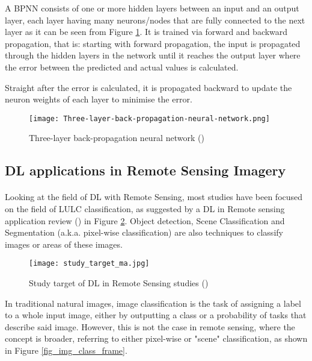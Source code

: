 A \gls{BPNN} consists of one or more hidden layers between an input and an output layer, each layer having many neurons/nodes that are fully connected to the next layer as it can be seen from Figure \ref{fig_bpnn}.  It is trained via forward and backward propagation, that is: starting with forward propagation, the input is propagated through the hidden layers in the network until it reaches the output layer where the error between the predicted and actual values is calculated. 

Straight after the error is calculated, it is propagated backward to update the neuron weights of each layer to minimise the error.

    \begin{figure}[hbt!]
        \centering
        \texttt{[image: Three-layer-back-propagation-neural-network.png]}
        \caption{Three-layer back-propagation neural network (\cite{NNpic})}
        \label{fig_bpnn}
    \end{figure}

\subsection{\gls{DL} applications in Remote Sensing Imagery} \label{dl_rs}
\paragraph{}
Looking at the field of \gls{DL} with Remote Sensing, most studies have been focused on the field of \gls{LULC} classification, as suggested by a \gls{DL} in Remote sensing application review (\cite{MA2019166}) in Figure \ref{fig_dl_studies}. Object detection, Scene Classification and Segmentation (\gls{a.k.a.} pixel-wise classification) are also techniques to classify images or areas of these images.

    \begin{figure}[hbt!]
        \centering
        \texttt{[image: study\_target\_ma.jpg]}
        \caption{Study target of \gls{DL} in Remote Sensing studies (\cite{MA2019166})}
        \label{fig_dl_studies}
    \end{figure}

In traditional natural images, image classification is the task of assigning a label to a whole input image, either by outputting a class or a probability of tasks that describe said image. However, this is not the case in remote sensing, where the concept is broader, referring to either pixel-wise or "scene" classification, as shown in Figure \ref{fig_img_class_frame}.

